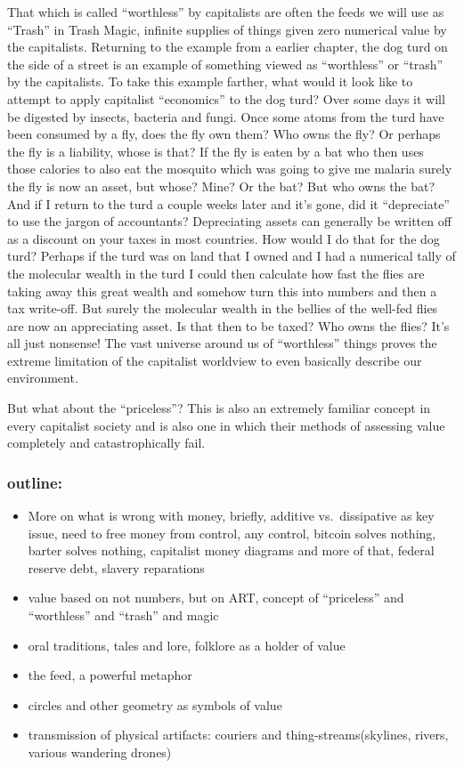 That which is called ``worthless'' by capitalists are often the feeds we
will use as ``Trash'' in Trash Magic, infinite supplies of things given
zero numerical value by the capitalists. Returning to the example from a
earlier chapter, the dog turd on the side of a street is an example of
something viewed as ``worthless'' or ``trash'' by the capitalists. To
take this example farther, what would it look like to attempt to apply
capitalist ``economics'' to the dog turd? Over some days it will be
digested by insects, bacteria and fungi. Once some atoms from the turd
have been consumed by a fly, does the fly own them? Who owns the fly? Or
perhaps the fly is a liability, whose is that? If the fly is eaten by a
bat who then uses those calories to also eat the mosquito which was
going to give me malaria surely the fly is now an asset, but whose?
Mine? Or the bat? But who owns the bat? And if I return to the turd a
couple weeks later and it's gone, did it ``depreciate'' to use the
jargon of accountants? Depreciating assets can generally be written off
as a discount on your taxes in most countries. How would I do that for
the dog turd? Perhaps if the turd was on land that I owned and I had a
numerical tally of the molecular wealth in the turd I could then
calculate how fast the flies are taking away this great wealth and
somehow turn this into numbers and then a tax write-off. But surely the
molecular wealth in the bellies of the well-fed flies are now an
appreciating asset. Is that then to be taxed? Who owns the flies? It's
all just nonsense! The vast universe around us of ``worthless'' things
proves the extreme limitation of the capitalist worldview to even
basically describe our environment.

But what about the ``priceless''? This is also an extremely familiar
concept in every capitalist society and is also one in which their
methods of assessing value completely and catastrophically fail.

\subsubsection{outline:}\label{outline}

\begin{itemize}
\tightlist
\item
  More on what is wrong with money, briefly, additive vs.~dissipative as
  key issue, need to free money from control, any control, bitcoin
  solves nothing, barter solves nothing, capitalist money diagrams and
  more of that, federal reserve debt, slavery reparations
\item
  value based on not numbers, but on ART, concept of ``priceless'' and
  ``worthless'' and ``trash'' and magic
\item
  oral traditions, tales and lore, folklore as a holder of value
\item
  the feed, a powerful metaphor
\item
  circles and other geometry as symbols of value
\item
  transmission of physical artifacts: couriers and
  thing-streams(skylines, rivers, various wandering drones)
\end{itemize}

